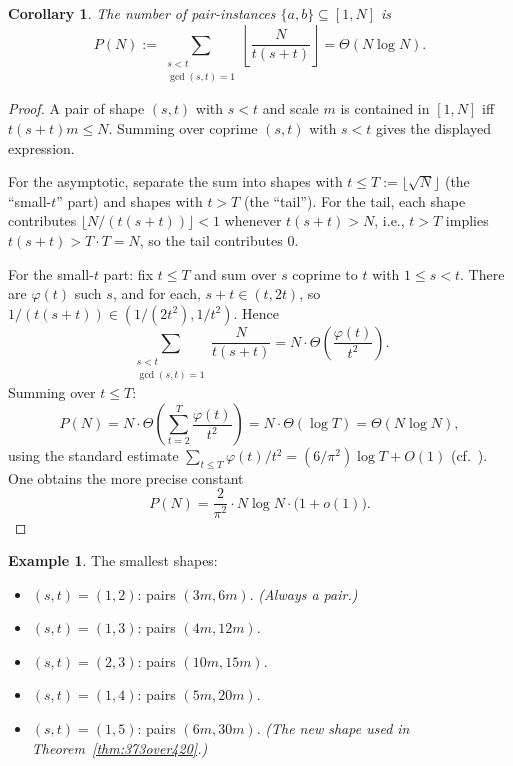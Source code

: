 \documentclass[11pt]{amsart}
\theoremstyle{plain}
\newtheorem{corollary}[theorem]{Corollary}
\theoremstyle{definition}
\newtheorem{example}[theorem]{Example}
\begin{document}
\begin{corollary}\label{cor:pair-count}
The number of pair-instances $\{a, b\} \subseteq [1, N]$ is
\[
  P(N) := \sum_{\substack{s < t \\ \gcd(s, t) = 1}} \left\lfloor \frac{N}{t(s + t)} \right\rfloor = \Theta(N \log N).
\]
\end{corollary}

\begin{proof}
A pair of shape $(s, t)$ with $s < t$ and scale $m$ is contained in $[1, N]$ iff $t(s+t) m \leq N$. Summing over coprime $(s, t)$ with $s < t$ gives the displayed expression.

For the asymptotic, separate the sum into shapes with $t \leq T := \lfloor \sqrt{N} \rfloor$ (the ``small-$t$'' part) and shapes with $t > T$ (the ``tail''). For the tail, each shape contributes $\lfloor N/(t(s+t)) \rfloor < 1$ whenever $t(s+t) > N$, i.e., $t > T$ implies $t(s+t) > T \cdot T = N$, so the tail contributes $0$.

For the small-$t$ part: fix $t \leq T$ and sum over $s$ coprime to $t$ with $1 \leq s < t$. There are $\varphi(t)$ such $s$, and for each, $s + t \in (t, 2t)$, so $1/(t(s+t)) \in (1/(2t^2), 1/t^2)$. Hence
\[
  \sum_{\substack{s < t \\ \gcd(s,t) = 1}} \frac{N}{t(s+t)} = N \cdot \Theta\!\left(\frac{\varphi(t)}{t^2}\right).
\]
Summing over $t \leq T$:
\[
  P(N) = N \cdot \Theta\!\left( \sum_{t=2}^{T} \frac{\varphi(t)}{t^2} \right) = N \cdot \Theta(\log T) = \Theta(N \log N),
\]
using the standard estimate $\sum_{t \leq T} \varphi(t)/t^2 = (6/\pi^2) \log T + O(1)$ (cf.~\cite[Thm.~3.7]{ApostolANT}). One obtains the more precise constant
\[
  P(N) = \frac{2}{\pi^2} \cdot N \log N \cdot \bigl(1 + o(1)\bigr).
\]
\end{proof}

\begin{example}
The smallest shapes:
\begin{itemize}
  \item $(s, t) = (1, 2)$: pairs $(3m, 6m)$. \emph{(Always a pair.)}
  \item $(s, t) = (1, 3)$: pairs $(4m, 12m)$.
  \item $(s, t) = (2, 3)$: pairs $(10m, 15m)$.
  \item $(s, t) = (1, 4)$: pairs $(5m, 20m)$.
  \item $(s, t) = (1, 5)$: pairs $(6m, 30m)$. \emph{(The new shape used in Theorem~\ref{thm:373over420}.)}
\end{itemize}
\end{example}
\end{document}
